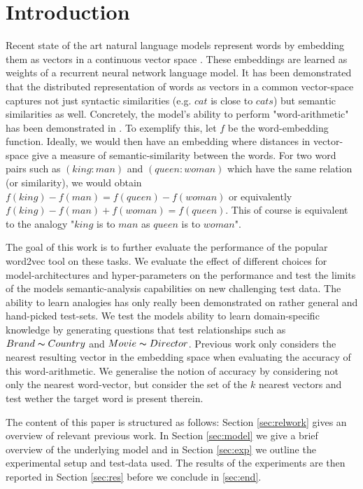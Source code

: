 \documentclass[conference]{IEEEtran}
\begin{document}
\section{Introduction}

Recent state of the art natural language models represent words by embedding them
as vectors in a continuous vector space \cite{mikolov2013efficient} \cite{pennington2014glove}.
These embeddings are learned as weights of a recurrent neural network language model.
It has been demonstrated that the distributed representation of words as vectors
in a common vector-space captures not just syntactic similarities (e.g. $cat$
is close to $cats$) but semantic similarities as well. Concretely, the model's ability to
perform "word-arithmetic" has been demonstrated in \cite{mikolov2013linguistic}.
To exemplify this, let $f$ be the word-embedding function. Ideally, we would then
have an embedding where distances in vector-space give a measure of
semantic-similarity between the words. For two word pairs such as $(king:man)$
and $(queen:woman)$ which have the same relation (or similarity), we would
obtain $f(king)-f(man) = f(queen) - f(woman)$ or equivalently $f(king)-f(man) +
f(woman) = f(queen)$. This of course is equivalent to the analogy "$king$ is
to $man$ as $queen$ is to $woman$". 

The goal of this work is to further evaluate the performance
of the popular word2vec tool on these tasks. We evaluate the effect of
different choices for model-architectures and hyper-parameters on the performance and test
the limits of the models semantic-analysis capabilities on new challenging test data. 
The ability to learn analogies has only really been demonstrated on rather general and 
hand-picked test-sets. We test the models ability to learn domain-specific knowledge by 
generating questions that test relationships such as $Brand \thicksim Country$ 
and $Movie \thicksim Director$. Previous work only considers the nearest 
resulting vector in the embedding space when evaluating the accuracy of this word-arithmetic. 
We generalise the notion of accuracy by considering not only the nearest word-vector, but 
consider the set of the $k$ nearest vectors and test wether the target word is present therein. 


The content of this paper is structured as follows: Section \ref{sec:relwork} gives an overview 
of relevant previous work. In Section \ref{sec:model} we give a brief overview of the underlying 
model and in Section \ref{sec:exp} we outline the experimental setup and test-data used. 
The results of the experiments are then reported in Section \ref{sec:res} before we conclude
in \ref{sec:end}.
\end{document}
